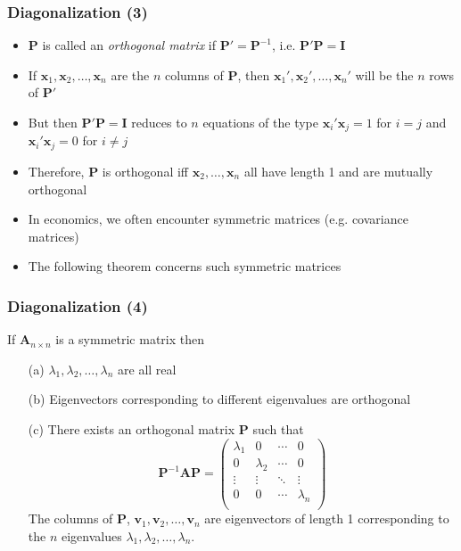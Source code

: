\documentclass[10pt]{beamer}
\theoremstyle{definition}
\begin{document}
\begin{frame}[fragile]
\frametitle{Diagonalization (3)}
\begin{itemize}
	\item $\mathbf{P}$ is called an \textit{orthogonal matrix} if $\mathbf{P}' = \mathbf{P}^{-1}$, i.e. $\mathbf{P'P = I}$
	\item If $\mathbf{x}_{1}, \mathbf{x}_{2},\ldots, \mathbf{x}_{n}$ are the $n$ columns of $\mathbf{P}$, then $\mathbf{x}_{1}', \mathbf{x}_{2}',\ldots, \mathbf{x}_{n}'$ will be the $n$ rows of $\mathbf{P}'$
	\item But then $\mathbf{P'P = I}$ reduces to $n$ equations of the type $\mathbf{x}_{i}'\mathbf{x}_{j} = 1$ for $i = j$ and $\mathbf{x}_{i}'\mathbf{x}_{j} = 0$ for $i\neq j$
	\item Therefore, $\mathbf{P}$ is orthogonal iff $\mathbf{x}_{2},\ldots, \mathbf{x}_{n}$ all have length 1 and are mutually orthogonal
	\item In economics, we often encounter symmetric matrices (e.g. covariance matrices)
	\item The following theorem concerns such symmetric matrices
\end{itemize}
\end{frame}

\begin{frame}[fragile]
\frametitle{Diagonalization (4)}
\begin{theorem}
If $\mathbf{A}_{n\times n}$ is a symmetric matrix then
\begin{itemize}
	\item[(a)] $\lambda_{1},\lambda_{2},\ldots,\lambda_{n}$ are all real
	\item[(b)] Eigenvectors corresponding to different eigenvalues are orthogonal
	\item[(c)] There exists an orthogonal matrix $\mathbf{P}$ such that
	\[
		\mathbf{P}^{-1}\mathbf{AP} = 
		\begin{pmatrix}
			\lambda_{1} & 0 & \cdots & 0\\
			0 & \lambda_{2} & \cdots & 0\\
			\vdots & \vdots & \ddots & \vdots\\
			0 & 0 & \cdots & \lambda_{n}\\
		\end{pmatrix}
	\]
	The columns of $\mathbf{P}$, $\mathbf{v}_{1}, \mathbf{v}_{2},\ldots,\mathbf{v}_{n}$ are eigenvectors of length 1 corresponding to the $n$ eigenvalues $\lambda_{1},\lambda_{2},\ldots, \lambda_{n}$.
\end{itemize}
\end{theorem}
\end{frame}
\end{document}
